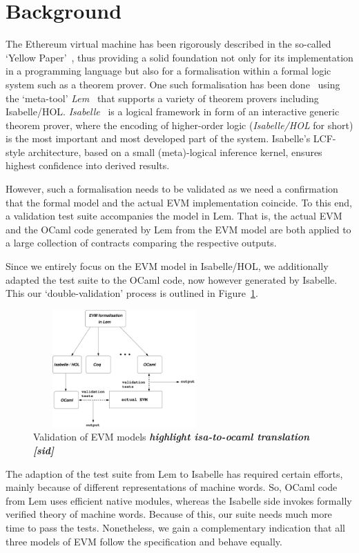 \documentclass[sigplan,10pt,review]{acmart}\settopmatter{printfolios=true,printccs=false,printacmref=false}
\newcommand{\sid}[1]{\textit{\textbf{#1 [sid]}}}
\begin{document}
\section{Background} 
\label{sec:bg}
The Ethereum virtual machine has been rigorously described in the so-called `Yellow Paper'~\cite{wood2014ethereum},
thus providing a solid foundation not only for its implementation in a programming language 
but also for a formalisation within a formal logic system such as a theorem prover.
One such formalisation has been done~\cite{Yoichi} using the `meta-tool' \emph{Lem}~\cite{DBLP:conf/icfp/MulliganOGRS14}
that supports a variety of theorem provers including Isabelle/HOL.
\emph{Isabelle}~\cite{Nipkow_PW:Isabelle} is a logical framework in form of an interactive generic theorem prover,
where the encoding of higher-order logic (\emph{Isabelle/HOL} for short)
is the most important and most developed part of the system. Isabelle's LCF-style architecture,
based on a small (meta)-logical inference kernel, ensures highest confidence into derived results.
 
However, such a formalisation needs to be validated as we need a confirmation that the formal model
and the actual EVM implementation coincide. To this end, a validation test suite accompanies
the model in Lem. That is, the actual EVM and the OCaml code generated by Lem from the EVM model
are both applied to a large collection of contracts comparing the respective outputs.  

Since we entirely focus on the EVM model in Isabelle/HOL, we additionally adapted the test suite 
to the OCaml code, now however generated by Isabelle. This our `double-validation' 
process is outlined in Figure~\ref{fig:valid}.          
\begin{figure}[htbp]
\centering
\includegraphics[height=4.5cm, width=7cm]{images/evm_lem}    
        \caption{Validation of EVM models \sid{highlight isa-to-ocaml translation}}
\label{fig:valid}
\end{figure}
The adaption of the test suite from Lem to Isabelle has required certain efforts, mainly because 
of different representations of machine words. So, OCaml code from Lem uses efficient native modules,
whereas the Isabelle side invokes formally verified theory of machine words. Because of this, our suite
needs much more time to pass the tests. Nonetheless, we gain a complementary indication that
all three models of EVM follow the specification and behave equally.    
%
\end{document}

